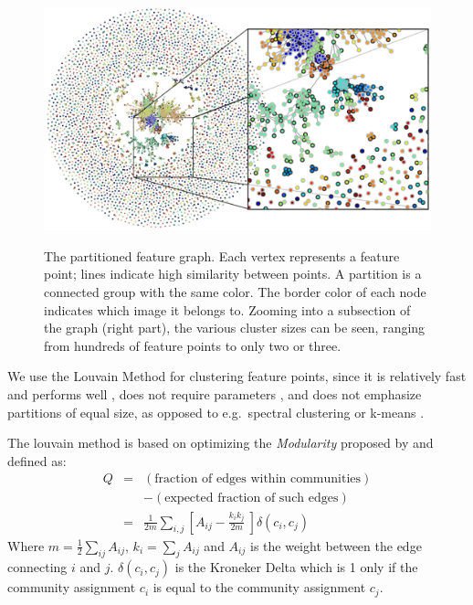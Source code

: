 \begin{figure}[t]
    \centering
	\includegraphics[width=\textwidth]{images/MMC_graph}
    \label{fig:graph}
	\caption{The partitioned feature graph. Each vertex represents a 
		feature point; lines indicate high similarity between points. A 
		partition is a connected group with the same color. The border 
		color of each node indicates which image it belongs to.  Zooming 
	into a subsection of the graph (right part), the various cluster 
sizes can be seen, ranging from hundreds of feature points to only two 
or three.}
	\label{fig:graph}
\end{figure}

We use the Louvain Method \cite{blondel2008} for clustering feature 
points, since it is relatively fast and performs well 
\cite{lancichinetti2009}, does not require parameters 
\cite{blondel2008}, and does not emphasize partitions of equal size, as 
opposed to e.g.\ spectral clustering or k-means \cite{von2007}.

The louvain method is based on optimizing the \emph{Modularity} proposed 
by \cite{girvan2002} and defined as:
\begin{eqnarray*}
	Q & = & (\mbox{fraction of edges within communities}) \\
	  & & - (\mbox{expected fraction of such edges}) \\
	& = & \frac{1}{2m} \sum_{i,j} \left[ A_{ij} - \frac{k_i k_j}{2m} \
\right] \delta(c_i, c_j)
\end{eqnarray*}
Where $m=\frac{1}{2} \sum_{ij} A_{ij}$, $k_i = \sum_j A_{ij}$ and 
$A_{ij}$ is the weight between the edge connecting $i$ and $j$.  
$\delta(c_i, c_j)$ is the Kroneker Delta which is 1 only if the 
community assignment $c_i$ is equal to the community assignment $c_j$.

